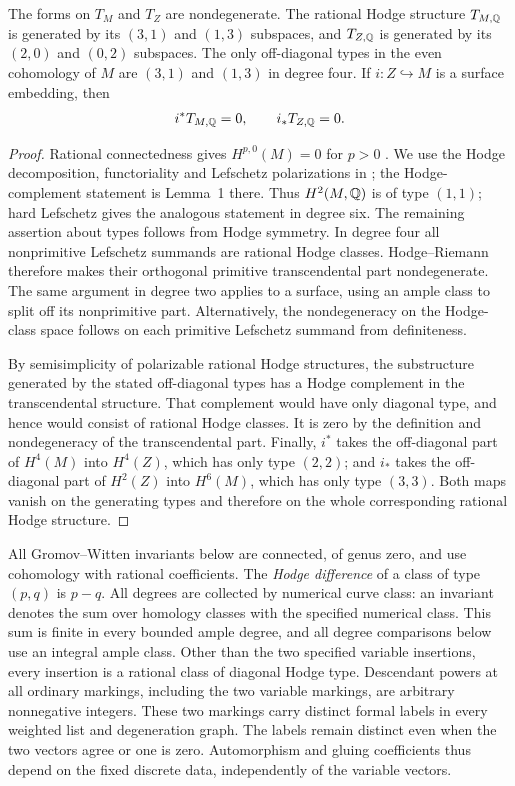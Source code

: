 \begin{lemma}\label{gw:hodge}
The forms on $T_M$ and $T_Z$ are nondegenerate.  The rational Hodge structure
$T_{M,\mathbb Q}$ is generated by its $(3,1)$ and $(1,3)$ subspaces, and
$T_{Z,\mathbb Q}$ is generated by its $(2,0)$ and $(0,2)$ subspaces.  The only
off-diagonal types in the even cohomology of $M$ are $(3,1)$ and $(1,3)$ in
degree four.  If $i:Z\hookrightarrow M$ is a surface embedding, then
\[
 i^*T_{M,\mathbb Q}=0,\qquad i_*T_{Z,\mathbb Q}=0.
\]
\end{lemma}
\begin{proof}
Rational connectedness gives $H^{p,0}(M)=0$ for $p>0$
\cite[Theorem~30]{AraujoKollar02}.
We use the Hodge decomposition, functoriality and Lefschetz polarizations
in \cite[Sections~2.1--2.2]{VoisinHodge2016}; the Hodge-complement
statement is Lemma~1 there.
Thus $H^2(M,\mathbb Q)$ is of type $(1,1)$; hard Lefschetz gives the analogous
statement in degree six.  The remaining assertion about types follows from
Hodge symmetry.  In degree four all nonprimitive Lefschetz summands are
rational Hodge classes.  Hodge--Riemann therefore makes their orthogonal
primitive transcendental part nondegenerate.  The same argument in degree
two applies to a surface, using an ample class to split off its
nonprimitive part.  Alternatively, the nondegeneracy on the Hodge-class
space follows on each primitive Lefschetz summand from definiteness.

By semisimplicity of polarizable rational Hodge structures, the substructure
generated by the stated off-diagonal types has a Hodge complement in the
transcendental structure.  That complement would have only diagonal type,
and hence would consist of rational Hodge classes.  It is zero by the
definition and nondegeneracy of the transcendental part.  Finally, $i^*$
takes the off-diagonal part of $H^4(M)$ into $H^4(Z)$, which has only type
$(2,2)$; and $i_*$ takes the off-diagonal part of $H^2(Z)$ into $H^6(M)$,
which has only type $(3,3)$.  Both maps vanish on the generating types and
therefore on the whole corresponding rational Hodge structure.
\end{proof}

All Gromov--Witten invariants below are connected, of genus zero, and use
cohomology with rational coefficients.  The \emph{Hodge difference} of a
class of type $(p,q)$ is $p-q$.  All degrees are collected by numerical
curve class: an invariant denotes the sum over homology classes with the specified numerical class.  This
sum is finite in every bounded ample degree, and
all degree comparisons below use an integral ample class.  Other than the
two specified variable insertions, every insertion is a rational class of
diagonal Hodge type.  Descendant powers at all ordinary markings, including
the two variable markings, are arbitrary nonnegative integers.
These two markings carry distinct formal labels in every weighted list
and degeneration graph. The labels remain distinct even when the two
vectors agree or one is zero. Automorphism and gluing coefficients thus
depend on the fixed discrete data, independently of the variable vectors.

